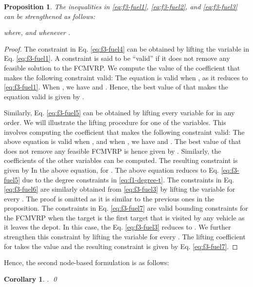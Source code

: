 \documentclass[letterpaper, 10pt, conference]{ieeeconf}
\newtheorem{proposition}{Proposition}
\newtheorem{corollary}{Corollary}
\begin{document}
\begin{proposition} \label{prop:lifting} The inequalities in \eqref{eq:f3-fuel1}, \eqref{eq:f3-fuel2}, and \eqref{eq:f3-fuel3} can be strengthened as follows:

where,  and  whenever .
\end{proposition} 
\begin{proof}
The constraint in Eq. \eqref{eq:f3-fuel4} can be obtained by lifting the variable  in Eq. \eqref{eq:f3-fuel1}. A constraint is said to be ``valid'' if it does not remove any feasible solution to the FCMVRP. We compute the value of the coefficient  that makes the following constraint valid:  The equation is valid when , as it reduces to \eqref{eq:f3-fuel1}. When , we have  and . Hence, the best value of  that makes the equation valid is given by . 

Similarly, Eq. \eqref{eq:f3-fuel5} can be obtained by lifting every  variable for  in any order. We will illustrate the lifting procedure for one of the  variables. This involves computing the coefficient  that makes the following constraint valid:  The above equation is valid when , and when , we have  and . The best value of  that does not remove any feasible FCMVRP is hence given by . Similarly, the coefficients of the other  variables can be computed. The resulting constraint is given by  In the above equation,  for . The above equation reduces to Eq. \eqref{eq:f3-fuel5} due to the degree constraints in \eqref{eq:f1-degree-t}. The constraints in Eq. \eqref{eq:f3-fuel6} are similarly obtained from \eqref{eq:f3-fuel3} by lifting the  variable for every . The proof is omitted as it is similar to the previous ones in the proposition. The constraints in Eq. \eqref{eq:f3-fuel7} are valid bounding constraints for the FCMVRP when the target  is the first target that is visited by any vehicle as it leaves the depot. In this case, the Eq. \eqref{eq:f3-fuel3} reduces to . We further strengthen this constraint by lifting the variable  for every . The lifting coefficient  for  takes the value  and the resulting constraint is given by Eq. \eqref{eq:f3-fuel7}.
\end{proof}

Hence, the second node-based formulation is as follows:


\begin{corollary} \label{cor:LPnode} . \hfill \qed
\end{corollary}
\end{document}
